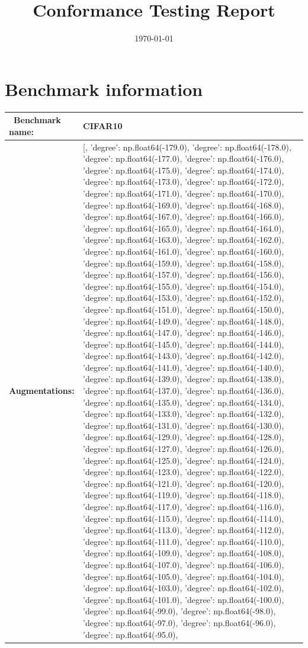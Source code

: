 \documentclass[parskip=half]{scrartcl}
\title{Conformance Testing Report}
\author{\relax}\date{\today}
\begin{document}
 \maketitle
        \section{Benchmark information}
        \begin{tabular}{l|l} \
        \textbf{Benchmark name:} & CIFAR10 \\ \hline
        \textbf{Augmentations:} & [{}, {'degree': np.float64(-179.0)}, {'degree': np.float64(-178.0)}, {'degree': np.float64(-177.0)}, {'degree': np.float64(-176.0)}, {'degree': np.float64(-175.0)}, {'degree': np.float64(-174.0)}, {'degree': np.float64(-173.0)}, {'degree': np.float64(-172.0)}, {'degree': np.float64(-171.0)}, {'degree': np.float64(-170.0)}, {'degree': np.float64(-169.0)}, {'degree': np.float64(-168.0)}, {'degree': np.float64(-167.0)}, {'degree': np.float64(-166.0)}, {'degree': np.float64(-165.0)}, {'degree': np.float64(-164.0)}, {'degree': np.float64(-163.0)}, {'degree': np.float64(-162.0)}, {'degree': np.float64(-161.0)}, {'degree': np.float64(-160.0)}, {'degree': np.float64(-159.0)}, {'degree': np.float64(-158.0)}, {'degree': np.float64(-157.0)}, {'degree': np.float64(-156.0)}, {'degree': np.float64(-155.0)}, {'degree': np.float64(-154.0)}, {'degree': np.float64(-153.0)}, {'degree': np.float64(-152.0)}, {'degree': np.float64(-151.0)}, {'degree': np.float64(-150.0)}, {'degree': np.float64(-149.0)}, {'degree': np.float64(-148.0)}, {'degree': np.float64(-147.0)}, {'degree': np.float64(-146.0)}, {'degree': np.float64(-145.0)}, {'degree': np.float64(-144.0)}, {'degree': np.float64(-143.0)}, {'degree': np.float64(-142.0)}, {'degree': np.float64(-141.0)}, {'degree': np.float64(-140.0)}, {'degree': np.float64(-139.0)}, {'degree': np.float64(-138.0)}, {'degree': np.float64(-137.0)}, {'degree': np.float64(-136.0)}, {'degree': np.float64(-135.0)}, {'degree': np.float64(-134.0)}, {'degree': np.float64(-133.0)}, {'degree': np.float64(-132.0)}, {'degree': np.float64(-131.0)}, {'degree': np.float64(-130.0)}, {'degree': np.float64(-129.0)}, {'degree': np.float64(-128.0)}, {'degree': np.float64(-127.0)}, {'degree': np.float64(-126.0)}, {'degree': np.float64(-125.0)}, {'degree': np.float64(-124.0)}, {'degree': np.float64(-123.0)}, {'degree': np.float64(-122.0)}, {'degree': np.float64(-121.0)}, {'degree': np.float64(-120.0)}, {'degree': np.float64(-119.0)}, {'degree': np.float64(-118.0)}, {'degree': np.float64(-117.0)}, {'degree': np.float64(-116.0)}, {'degree': np.float64(-115.0)}, {'degree': np.float64(-114.0)}, {'degree': np.float64(-113.0)}, {'degree': np.float64(-112.0)}, {'degree': np.float64(-111.0)}, {'degree': np.float64(-110.0)}, {'degree': np.float64(-109.0)}, {'degree': np.float64(-108.0)}, {'degree': np.float64(-107.0)}, {'degree': np.float64(-106.0)}, {'degree': np.float64(-105.0)}, {'degree': np.float64(-104.0)}, {'degree': np.float64(-103.0)}, {'degree': np.float64(-102.0)}, {'degree': np.float64(-101.0)}, {'degree': np.float64(-100.0)}, {'degree': np.float64(-99.0)}, {'degree': np.float64(-98.0)}, {'degree': np.float64(-97.0)}, {'degree': np.float64(-96.0)}, {'degree': np.float64(-95.0)}, {'degree': 
\end{tabular}
\end{document}
